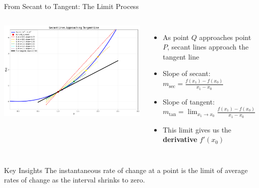 \documentclass{beamer}
\begin{document}
\begin{frame}{From Secant to Tangent: The Limit Process}
  \begin{columns}
      \begin{center}
        \includegraphics[width=\textwidth]{figures/secant_to_tangent_demo.png}
      \end{center}
      \begin{itemize}
        \item As point $Q$ approaches point $P$, secant lines approach the tangent line
        \item Slope of secant: $m_{\text{sec}} = \frac{f(x_1) - f(x_0)}{x_1 - x_0}$
        \item Slope of tangent: $m_{\text{tan}} = \lim_{x_1 \to x_0} \frac{f(x_1) - f(x_0)}{x_1 - x_0}$
        \item This limit gives us the \textbf{derivative} $f'(x_0)$
      \end{itemize}
  \end{columns}
  \vspace{1ex}
  \begin{block}{Key Insights}
    The instantaneous rate of change at a point is the limit of average rates of change as the interval shrinks to zero.
  \end{block}
\end{frame}
\end{document}
